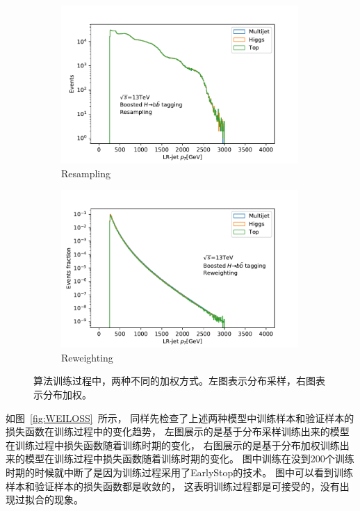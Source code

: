 \begin{figure}[htbp]
  \begin{subfigure}{.5\textwidth}
  \centering
   \includegraphics[width=0.99\textwidth]{figuresXbb/resample.pdf}
   \caption{Resampling}
   \label{fig:resample}
  \end{subfigure}
  \begin{subfigure}{.5\textwidth}
  \centering
   \includegraphics[width=0.99\textwidth]{figuresXbb/reweight.pdf}
   \caption{Reweighting}
   \label{fig:reweight}
  \end{subfigure}
  \caption{
  算法训练过程中，两种不同的加权方式。左图表示分布采样，右图表示分布加权。
  }
  \label{fig:ReweightPt}
\end{figure} 

如图~\ref{fig:WEILOSS}~所示，
同样先检查了上述两种模型中训练样本和验证样本的损失函数在训练过程中的变化趋势，
左图展示的是基于分布采样训练出来的模型在训练过程中损失函数随着训练时期的变化，
右图展示的是基于分布加权训练出来的模型在训练过程中损失函数随着训练时期的变化。
图中训练在没到200个训练时期的时候就中断了是因为训练过程采用了EarlyStop的技术。
图中可以看到训练样本和验证样本的损失函数都是收敛的，
这表明训练过程都是可接受的，没有出现过拟合的现象。

